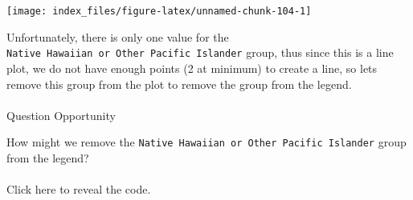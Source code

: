 \documentclass[
]{article}
\begin{document}
\begin{center}\texttt{[image: index\_files/figure-latex/unnamed-chunk-104-1]} \end{center}

Unfortunately, there is only one value for the
\texttt{Native\ Hawaiian\ or\ Other\ Pacific\ Islander} group, thus
since this is a line plot, we do not have enough points (2 at minimum)
to create a line, so lets remove this group from the plot to remove the
group from the legend.

\hypertarget{section-24}{%
\paragraph{}\label{section-24}}

Question Opportunity

How might we remove the
\texttt{Native\ Hawaiian\ or\ Other\ Pacific\ Islander} group from the
legend?

\hypertarget{section-25}{%
\paragraph{}\label{section-25}}

Click here to reveal the code.
\end{document}
